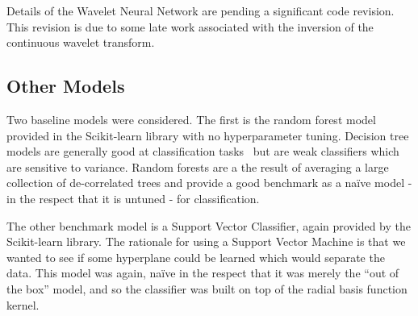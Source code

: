 Details of the Wavelet Neural Network are pending a significant code revision.
This revision is due to some late work associated with the inversion of the continuous wavelet transform.

\subsection{Other Models} \label{other models}
Two baseline models were considered.
The first is the random forest model provided in the Scikit-learn library with no hyperparameter tuning.
Decision tree models are generally good at classification tasks~\cite{hastie01statisticallearning} but are weak classifiers which are sensitive to variance.
Random forests are a the result of averaging a large collection of de-correlated trees and provide a good benchmark as a na\"ive model - in the respect that it is untuned - for classification.

The other benchmark model is a Support Vector Classifier, again provided by the Scikit-learn library.
The rationale for using a Support Vector Machine is that we wanted to see if some hyperplane could be learned which would separate the data.
This model was again, na\"ive in the respect that it was merely the ``out of the box'' model, and so the classifier was built on top of the radial basis function kernel.